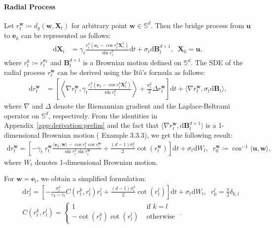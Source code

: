 \paragraph{Radial Process \label{app:derivation:radial}}
Let $r^{\bm{w}}_t \coloneqq d_g(\bm{w}, \bm{X}_t)$ for arbitrary point $\bm{w}\in\mathbb{S}^d$. 
Then the bridge process from $\bm{u}$ to $\bm{e}_k$ can be represented as follows:
\begin{align}
    \mathrm{d}\bm{X}_t 
    &= \gamma_t \frac{r^k_t(\bm{e}_k - \cos r^k_t \bm{X}^k_t)}{\sin r^k_t} \mathrm{d}t + \sigma_t \mathrm{d}\mathbf{B}^{d+1}_t, \;\; 
    \bm{X}_0 = \bm{u},
\end{align}
where $r^k_t\coloneqq r^{\bm{e}_k}_t$ and $\mathbf{B}^{d+1}_t$ is a Brownian motion defined on $\mathbb{S}^d$.
The SDE of the radial process $r^{\bm{w}}_t$ can be derived using the It\^{o}'s formula as follows:
\begin{align}
    \mathrm{d}r^{\bm{w}}_t
    &= \left[ 
        \left\langle \nabla r^{\bm{w}}_t, \gamma_t 
            \frac{r^k_t(\bm{e}_k - \cos r^k_t \bm{X}^k_t)}{\sin r^k_t}
        \right\rangle + \frac{\sigma^2_t}{2} \Delta r^{\bm{w}}_t
    \right] \mathrm{d}t
    + \Big\langle \nabla r^{\bm{w}}_t, \sigma_t \mathrm{d}\mathbf{B}_t \Big\rangle,
\end{align}
where $\nabla$ and $\Delta$ denote the Riemannian gradient and the Laplace-Beltrami operator on $\mathbb{S}^d$, respectively.
From the identities in Appendix~\ref{app:derivation:prelim} and the fact that $\langle \nabla r^{\bm{w}}_t, \mathrm{d}\mathbf{B}^{d+1}_t \rangle$ is a 1-dimensional Brownian motion (\citep{hsu2002stochastic} Example 3.3.3), we get the following result:
\begin{align}
    \mathrm{d}r^{\bm{w}}_t = \left[ 
        -\gamma_t \; r^{\bm{w}}_t 
            \frac{\langle \bm{e}_k,\bm{w}\rangle - \cos r^{k}_t \cos r^{\bm{w}}_t}{\sin r^{k}_t \sin r^{\bm{w}}_t}
    + \frac{(d-1)\sigma^2_t}{2}\cot(r^{\bm{w}}_t) 
    \right] \mathrm{d}t 
    + \sigma_t\mathrm{d}W_t , \;\;
    r^{\bm{w}}_0 \coloneqq \cos^{-1}\langle \bm{u}, \bm{w} \rangle,
\label{eq:radial_process}
\end{align}
where $W_t$ denotes 1-dimensional Brownian motion.

For $\bm{w}=\bm{e}_l$, we obtain a simplified formulation:
\begin{align}
    &\mathrm{d}r^l_t = \left[ -\frac{\sigma^2_t}{\tau_T-\tau_t} C(r^k_t, r^l_t) r^l_t 
    + \frac{(d-1)\sigma^2_t}{2}\cot(r^l_t) \right] \mathrm{d}t + \sigma_t\mathrm{d}W_t , \;\; r^l_0 = \frac{\pi}{2} \delta_{k,l} \\[6pt]
    &C(r^k_t, r^l_t) = \begin{cases}
        1 &\text{ if } k=l \\
        -\cot(r^k_t)\cot(r^l_t) &\text{ otherwise }
    \end{cases}.
\end{align}


